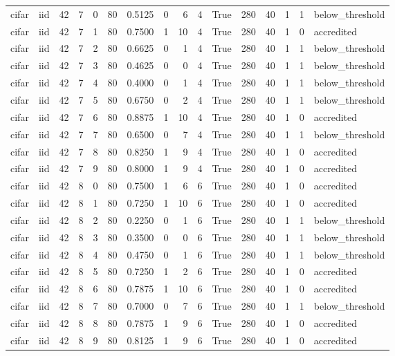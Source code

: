 \begin{tabular}{llrrrrrrrrrrrrrl}
cifar & iid & 42 & 7 & 0 & 80 & 0.5125 & 0 & 6 & 4 & True & 280 & 40 & 1 & 1 & below\_threshold \\
cifar & iid & 42 & 7 & 1 & 80 & 0.7500 & 1 & 10 & 4 & True & 280 & 40 & 1 & 0 & accredited \\
cifar & iid & 42 & 7 & 2 & 80 & 0.6625 & 0 & 1 & 4 & True & 280 & 40 & 1 & 1 & below\_threshold \\
cifar & iid & 42 & 7 & 3 & 80 & 0.4625 & 0 & 0 & 4 & True & 280 & 40 & 1 & 1 & below\_threshold \\
cifar & iid & 42 & 7 & 4 & 80 & 0.4000 & 0 & 1 & 4 & True & 280 & 40 & 1 & 1 & below\_threshold \\
cifar & iid & 42 & 7 & 5 & 80 & 0.6750 & 0 & 2 & 4 & True & 280 & 40 & 1 & 1 & below\_threshold \\
cifar & iid & 42 & 7 & 6 & 80 & 0.8875 & 1 & 10 & 4 & True & 280 & 40 & 1 & 0 & accredited \\
cifar & iid & 42 & 7 & 7 & 80 & 0.6500 & 0 & 7 & 4 & True & 280 & 40 & 1 & 1 & below\_threshold \\
cifar & iid & 42 & 7 & 8 & 80 & 0.8250 & 1 & 9 & 4 & True & 280 & 40 & 1 & 0 & accredited \\
cifar & iid & 42 & 7 & 9 & 80 & 0.8000 & 1 & 9 & 4 & True & 280 & 40 & 1 & 0 & accredited \\
cifar & iid & 42 & 8 & 0 & 80 & 0.7500 & 1 & 6 & 6 & True & 280 & 40 & 1 & 0 & accredited \\
cifar & iid & 42 & 8 & 1 & 80 & 0.7250 & 1 & 10 & 6 & True & 280 & 40 & 1 & 0 & accredited \\
cifar & iid & 42 & 8 & 2 & 80 & 0.2250 & 0 & 1 & 6 & True & 280 & 40 & 1 & 1 & below\_threshold \\
cifar & iid & 42 & 8 & 3 & 80 & 0.3500 & 0 & 0 & 6 & True & 280 & 40 & 1 & 1 & below\_threshold \\
cifar & iid & 42 & 8 & 4 & 80 & 0.4750 & 0 & 1 & 6 & True & 280 & 40 & 1 & 1 & below\_threshold \\
cifar & iid & 42 & 8 & 5 & 80 & 0.7250 & 1 & 2 & 6 & True & 280 & 40 & 1 & 0 & accredited \\
cifar & iid & 42 & 8 & 6 & 80 & 0.7875 & 1 & 10 & 6 & True & 280 & 40 & 1 & 0 & accredited \\
cifar & iid & 42 & 8 & 7 & 80 & 0.7000 & 0 & 7 & 6 & True & 280 & 40 & 1 & 1 & below\_threshold \\
cifar & iid & 42 & 8 & 8 & 80 & 0.7875 & 1 & 9 & 6 & True & 280 & 40 & 1 & 0 & accredited \\
cifar & iid & 42 & 8 & 9 & 80 & 0.8125 & 1 & 9 & 6 & True & 280 & 40 & 1 & 0 & accredited \\

\end{tabular}
